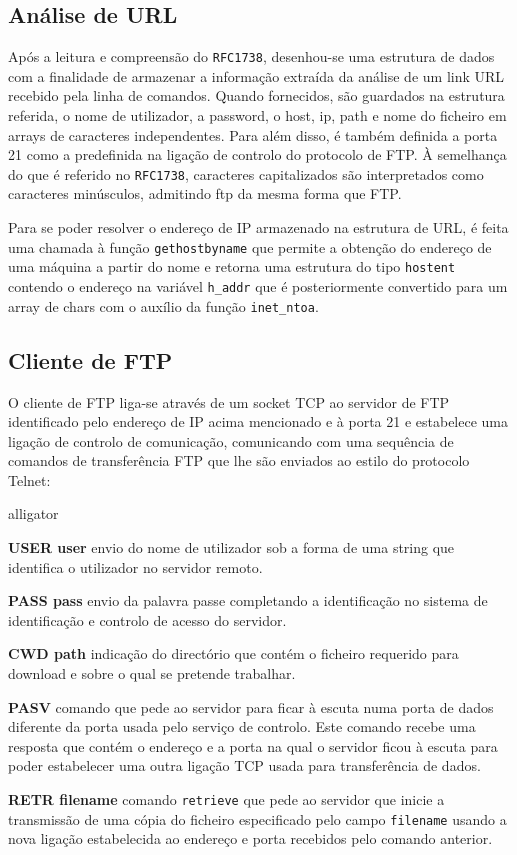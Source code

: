 \documentclass[a4paper,11pt,titlepage]{article}
\begin{document}
\subsection*{Análise de URL}
Após a leitura e compreensão do \texttt{RFC1738}, desenhou-se uma estrutura de
dados com a finalidade de armazenar a informação extraída da análise de um link
URL recebido pela linha de comandos. Quando fornecidos, são guardados na
estrutura referida, o nome de utilizador, a password, o host, ip, path e nome
do ficheiro em arrays de caracteres independentes. Para além disso, é também
definida a porta 21 como a predefinida na ligação de controlo do protocolo de
FTP. À semelhança do que é referido no \texttt{RFC1738}, caracteres
capitalizados são interpretados como caracteres minúsculos, admitindo ftp da
mesma forma que FTP.

Para se poder resolver o endereço de IP armazenado na estrutura de URL, é feita
uma chamada à função \texttt{gethostbyname} que permite a obtenção do endereço
de uma máquina a partir do nome e retorna uma estrutura do tipo
\texttt{hostent} contendo o endereço na variável \texttt{h\_addr} que é
posteriormente convertido para um array de chars com o auxílio da função
\texttt{inet\_ntoa}.

\subsection*{Cliente de FTP}
O cliente de FTP liga-se através de um socket TCP ao servidor de FTP
identificado pelo endereço de IP acima mencionado e à porta 21 e estabelece uma
ligação de controlo de comunicação, comunicando com uma sequência de comandos
de transferência FTP que lhe são enviados ao estilo do protocolo Telnet: 

\begin{labeling}{alligator}
\item [\textbf{USER user}] envio do nome de utilizador sob a forma de uma string que identifica o utilizador no servidor remoto.
\item [\textbf{PASS pass}] envio da palavra passe completando a identificação no sistema de identificação e controlo de acesso do servidor.
\item [\textbf{CWD path}] indicação do directório que contém o ficheiro requerido para download e sobre o qual se pretende trabalhar.
\item [\textbf{PASV}] comando que pede ao servidor para ficar à escuta numa porta de dados diferente da porta usada pelo serviço de controlo. Este comando recebe uma resposta que contém o endereço e a porta na qual o servidor ficou à escuta para poder estabelecer uma outra ligação TCP usada para transferência de dados.
\item [\textbf{RETR filename}] comando \texttt{retrieve} que pede ao servidor que inicie a transmissão de uma cópia do ficheiro especificado pelo campo \texttt{filename} usando a nova ligação estabelecida ao endereço e porta recebidos pelo comando anterior.
\end{labeling}
\end{document}
